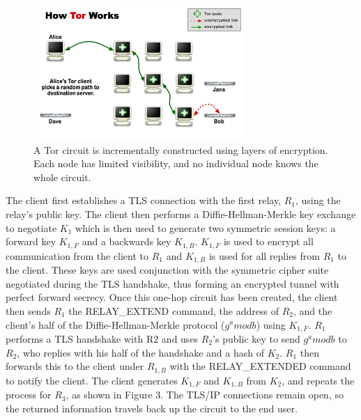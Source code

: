 \begin{figure}[htbp]
\centering
\begin{minipage}{8 cm}
    \includegraphics[width=80mm]{images/circuit-building-2-5.png}
    \caption{A Tor circuit is incrementally constructed using layers of encryption. Each node has limited visibility, and no individual node knows the whole circuit.}
\end{minipage}
\end{figure}

The client first establishes a TLS connection with the first relay, $R_{1}$, using the relay's public key. The client then performs a Diffie-Hellman-Merkle key exchange to negotiate $K_{1}$ which is then used to generate two symmetric session keys: a forward key $K_{1,F}$ and a backwards key $K_{1,B}$. $K_{1,F}$ is used to encrypt all communication from the client to $R_{1}$ and $K_{1,B}$ is used for all replies from $R_{1}$ to the client. These keys are used conjunction with the symmetric cipher suite negotiated during the TLS handshake, thus forming an encrypted tunnel with perfect forward secrecy. Once this one-hop circuit has been created, the client then sends $R_{1}$ the RELAY\_EXTEND command, the address of $R_{2}$, and the client's half of the Diffie-Hellman-Merkle protocol ($ g^a mod b $) using $K_{1,F}$. $R_{1}$ performs a TLS handshake with R${2}$ and uses $R_{2}$'s public key to send $ g^a mod b $ to $R_{2}$, who replies with his half of the handshake and a hash of $K_{2}$. $R_{1}$ then forwards this to the client under $R_{1,B}$ with the RELAY\_EXTENDED command to notify the client. The client generates $K_{1,F}$ and $K_{1,B}$ from $K_{2}$, and repeats the process for $R_{3}$,\cite{Ling2012} as shown in Figure 3. The TLS/IP connections remain open, so the returned information travels back up the circuit to the end user.

